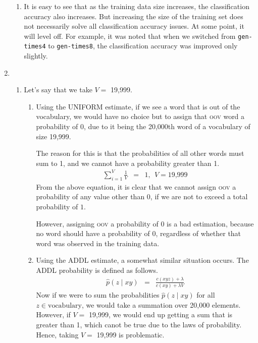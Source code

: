 \documentclass[11pt]{article}
\begin{document}
\begin{enumerate}
\begin{enumerate}[label=(\alph*)]
	\item %
		It is easy to see that as the training data size increases, the classification accuracy also increases. But increasing the size of the training set does not necessarily solve all classification accuracy issues. At some point, it will level off. For example, it was noted that when we switched from \texttt{gen-times4} to \texttt{gen-times8}, the classification accuracy was improved only slightly.
	\end{enumerate}
\item %
	\begin{enumerate}[label=(\alph*)]
	\item %
		Let's say that we take $V =$ 19,999. 

		\begin{enumerate}[label=\roman*.]
		\item
			Using the UNIFORM estimate, if we see a word that is out of the vocabulary, we would have no choice but to assign that \textsc{oov} word a probability of 0, due to it being the 20,000th word of a vocabulary of size 19,999. 

			The reason for this is that the probabilities of all other words must sum to 1, and we cannot have a probability greater than 1.
			\begin{eqnarray*}
				\sum\limits_{i=1}^{V}{\frac{1}{V}} &=& 1 , \ \ V = \text{19,999}
			\end{eqnarray*}
			From the above equation, it is clear that we cannot assign \textsc{oov} a probability of any value other than $0$, if we are not to exceed a total probability of $1$.

			However, assigning \textsc{oov} a probability of 0 is a bad estimation, because no word should have a probability of 0, regardless of whether that word was observed in the training data.
		\item
			Using the ADDL estimate, a somewhat similar situation occurs. The ADDL probability is defined as follows.
			\begin{eqnarray*}
				\hat{p}(z \mid xy) &=& \frac{c(xyz) + \lambda}{c(xy) + \lambda V}
			\end{eqnarray*}
			Now if we were to sum the probabilities $\hat{p}(z \mid xy)$ for all $z \in \text{vocabulary}$, we would take a summation over 20,000 elements. However, if $V =$ 19,999, we would end up getting a sum that is greater than 1, which canot be true due to the laws of probability. Hence, taking $V =$ 19,999 is problematic.


\end{enumerate}
\end{enumerate}
\end{enumerate}
\end{document}
